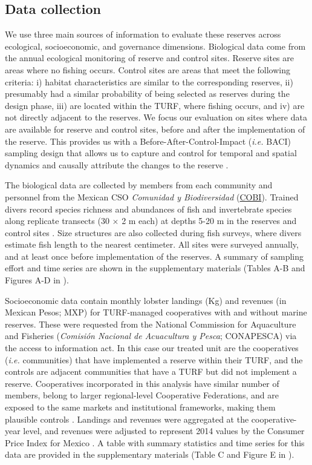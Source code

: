 \documentclass[10pt,letterpaper]{article}
\begin{document}
\subsection*{Data collection}

We use three main sources of information to evaluate these reserves across ecological, socioeconomic, and governance dimensions. Biological data come from the annual ecological monitoring of reserve and control sites. Reserve sites are areas where no fishing occurs. Control sites are areas that meet the following criteria: i) habitat characteristics are similar to the corresponding reserves, ii) presumably had a similar probability of being selected as reserves during the design phase, iii) are located within the TURF, where fishing occurs, and iv) are not directly adjacent to the reserves. We focus our evaluation on sites where data are available for reserve and control sites, before and after the implementation of the reserve. This provides us with a Before-After-Control-Impact (\emph{i.e.} BACI) sampling design that allows us to capture and control for temporal and spatial dynamics and causally attribute the changes to the reserve \cite{stewartoaten_1986,francinifilho_2008,depalma_2018,kerr_2019,Villasenor-Derbez_2018}.

The biological data are collected by members from each community and personnel from the Mexican CSO \emph{Comunidad y Biodiversidad} (\href{https://www.cobi.org.mx}{COBI}). Trained divers record species richness and abundances of fish and invertebrate species along replicate transects (30 $\times$ 2 m each) at depths 5-20 m in the reserves and control sites \cite{suman_2010-ez,fulton_2018,fulton_2019}. Size structures are also collected during fish surveys, where divers estimate fish length to the nearest centimeter. All sites were surveyed annually, and at least once before implementation of the reserves. A summary of sampling effort and time series are shown in the supplementary materials (Tables A-B and Figures A-D in ).

Socioeconomic data contain monthly lobster landings (Kg) and revenues (in Mexican Pesos; MXP) for TURF-managed cooperatives with and without marine reserves. These were requested from the National Commission for Aquaculture and Fisheries (\emph{Comisión Nacional de Acuacultura y Pesca}; CONAPESCA) via the access to information act. In this case our treated unit are the cooperatives (\emph{i.e.} communities) that have implemented a reserve within their TURF, and the controls are adjacent communities that have a TURF but did not implement a reserve. Cooperatives incorporated in this analysis have similar number of members, belong to larger regional-level Cooperative Federations, and are exposed to the same markets and institutional frameworks, making them plausible controls \cite{mccay_2014,mccay_2017,ayer_2018}. Landings and revenues were aggregated at the cooperative-year level, and revenues were adjusted to represent 2014 values by the Consumer Price Index for Mexico \cite{oecd_2017}. A table with summary statistics and time series for this data are provided in the supplementary materials (Table C and Figure E in ).
\end{document}
